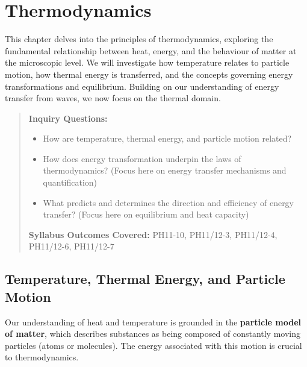 
\chapter{Thermodynamics}
\label{ch:thermodynamics}
\FloatBarrier %

This chapter delves into the principles of thermodynamics, exploring the fundamental relationship between heat, energy, and the behaviour of matter at the microscopic level. We will investigate how temperature relates to particle motion, how thermal energy is transferred, and the concepts governing energy transformations and equilibrium. Building on our understanding of energy transfer from waves, we now focus on the thermal domain.

\begin{quote}
\textbf{Inquiry Questions:}
\begin{itemize}
    \item How are temperature, thermal energy, and particle motion related?
    \item How does energy transformation underpin the laws of thermodynamics? (Focus here on energy transfer mechanisms and quantification)
    \item What predicts and determines the direction and efficiency of energy transfer? (Focus here on equilibrium and heat capacity)
\end{itemize}
\textbf{Syllabus Outcomes Covered:} PH11-10, PH11/12-3, PH11/12-4, PH11/12-6, PH11/12-7
\end{quote}

\section{Temperature, Thermal Energy, and Particle Motion}
\label{sec:temp_energy_particle}
\FloatBarrier

Our understanding of heat and temperature is grounded in the \textbf{particle model of matter}, which describes substances as being composed of constantly moving particles (atoms or molecules). The energy associated with this motion is crucial to thermodynamics.

